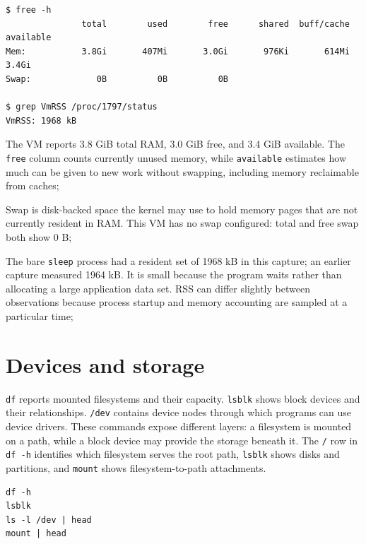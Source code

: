 \documentclass{assets/utmreport}
\begin{document}
\noindent\begin{minipage}{\linewidth}
\begin{lstlisting}[caption={Observed memory totals and resident set}]
$ free -h
               total        used        free      shared  buff/cache   available
Mem:           3.8Gi       407Mi       3.0Gi       976Ki       614Mi       3.4Gi
Swap:             0B          0B          0B

$ grep VmRSS /proc/1797/status
VmRSS: 1968 kB
\end{lstlisting}
\end{minipage}\par


\begin{utmenumerate}
\item The VM reports 3.8 GiB total RAM, 3.0 GiB free, and 3.4 GiB available. The \texttt{free} column counts currently unused memory, while \texttt{available} estimates how much can be given to new work without swapping, including memory reclaimable from caches;
\item Swap is disk-backed space the kernel may use to hold memory pages that are not currently resident in RAM. This VM has no swap configured: total and free swap both show 0 B;
\item The bare \texttt{sleep} process had a resident set of 1968 kB in this capture; an earlier capture measured 1964 kB. It is small because the program waits rather than allocating a large application data set. RSS can differ slightly between observations because process startup and memory accounting are sampled at a particular time;
\end{utmenumerate}

\section{Devices and storage}

\texttt{df} reports mounted filesystems and their capacity. \texttt{lsblk} shows block devices and their relationships. \texttt{/dev} contains device nodes through which programs can use device drivers. These commands expose different layers: a filesystem is mounted on a path, while a block device may provide the storage beneath it. The \texttt{/} row in \texttt{df -h} identifies which filesystem serves the root path, \texttt{lsblk} shows disks and partitions, and \texttt{mount} shows filesystem-to-path attachments.

\noindent\begin{minipage}{\linewidth}
\begin{lstlisting}[caption={Mounted storage and device interfaces}]
df -h
lsblk
ls -l /dev | head
mount | head
\end{lstlisting}
\end{minipage}\par
\end{document}
